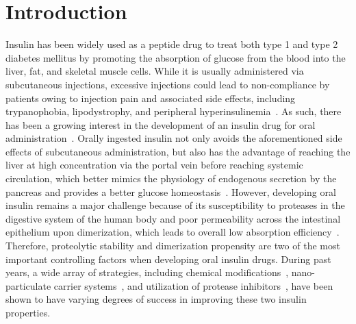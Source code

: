 \documentclass[sn-vancouver]{sn-jnl}
\begin{document}
\section{Introduction}
Insulin has been widely used as a peptide drug to treat both type 1 and type 2 diabetes mellitus by promoting the absorption of glucose from the blood into the liver, fat, and skeletal muscle cells. While it is usually administered via subcutaneous injections, excessive injections could lead to non-compliance by patients owing to injection pain and associated side effects, including trypanophobia, lipodystrophy, and peripheral hyperinsulinemia~\cite{carino1999oral}. As such, there has been a growing interest in the development of an insulin drug for oral administration~\cite{carino1999oral, fonte2013oral, gedawy2018oral}. Orally ingested insulin not only avoids the aforementioned side effects of subcutaneous administration, but also has the advantage of reaching the liver at high concentration via the portal vein before reaching systemic circulation, which better mimics the physiology of endogenous secretion by the pancreas and provides a better glucose homeostasis~\cite{hoffman1997pharmacokinetic, owens2002new}. 
However, developing oral insulin remains a major challenge because of its susceptibility to proteases in the digestive system of the human body and poor permeability across the intestinal epithelium upon dimerization, which leads to overall low absorption efficiency~\cite{bruno2013basics}. Therefore, proteolytic stability and dimerization propensity are two of the most important controlling factors when developing oral insulin drugs. During past years, a wide array of strategies, including chemical modifications~\cite{hinds2002effects, clement2002oral}, nano-particulate carrier systems~\cite{deng2017selenium, bhattacharyya2017preparation, zhou2020nanocomposite}, and utilization of protease inhibitors~\cite{agarwal2000oral}, have been shown to have varying degrees of success in improving these two insulin properties. 
\end{document}
